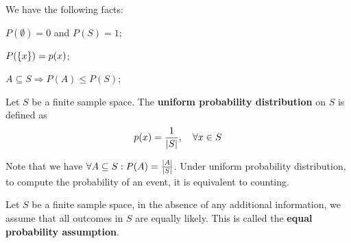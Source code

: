 \begin{remark}
    We have the following facts: \begin{enumerate*}[label=(\arabic*)]
        \item $P(\emptyset) = 0$ and $P(S) = 1$;
        \item $P(\{x\}) = p(x)$;
        \item $A\subseteq S \Rightarrow P(A)\leq P(S)$;
    \end{enumerate*}
\end{remark}

\begin{definition}
    Let $S$ be a finite sample space. The \textbf{uniform probability distribution} on $S$ is defined as
    \[
        p(x) = \frac{1}{\left|S\right|},\quad \forall x\in S
    \]
\end{definition}

Note that we have $\forall A\subseteq S: P(A) = \frac{\left|A\right|}{\left|S\right|}$.
Under uniform probability distribution, to compute the probability of an event,
it is equivalent to counting.

\begin{definition}
    Let $S$ be a finite sample space, in the absence of any additional information,
    we assume that all outcomes in $S$ are equally likely. This is called the
    \textbf{equal probability assumption}.
\end{definition}